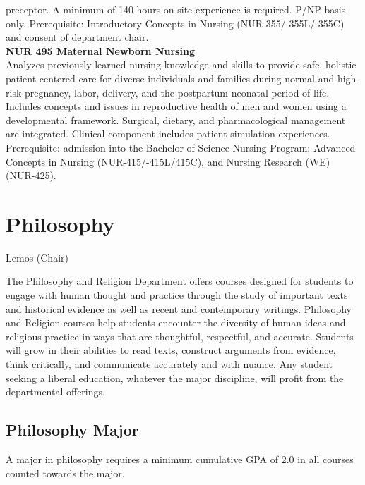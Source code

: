\documentclass[
  letterpaper,
]{scrbook}
\begin{document}
preceptor. A minimum of 140 hours on-site experience is required. P/NP
basis only. Prerequisite: Introductory Concepts in Nursing
(NUR-355/-355L/-355C) and consent of department chair.\\
\textbf{NUR 495 Maternal Newborn Nursing}\\
Analyzes previously learned nursing knowledge and skills to provide
safe, holistic patient-centered care for diverse individuals and
families during normal and high-risk pregnancy, labor, delivery, and the
postpartum-neonatal period of life. Includes concepts and issues in
reproductive health of men and women using a developmental framework.
Surgical, dietary, and pharmacological management are integrated.
Clinical component includes patient simulation experiences.
Prerequisite: admission into the Bachelor of Science Nursing Program;
Advanced Concepts in Nursing (NUR-415/-415L/415C), and Nursing Research
(WE) (NUR-425).

\section{Philosophy}\label{philosophy}

Lemos (Chair)

The Philosophy and Religion Department offers courses designed for
students to engage with human thought and practice through the study of
important texts and historical evidence as well as recent and
contemporary writings. Philosophy and Religion courses help students
encounter the diversity of human ideas and religious practice in ways
that are thoughtful, respectful, and accurate. Students will grow in
their abilities to read texts, construct arguments from evidence, think
critically, and communicate accurately and with nuance. Any student
seeking a liberal education, whatever the major discipline, will profit
from the departmental offerings.

\subsection{Philosophy Major}\label{philosophy-major}

A major in philosophy requires a minimum cumulative GPA of 2.0 in all
courses counted towards the major.
\end{document}
